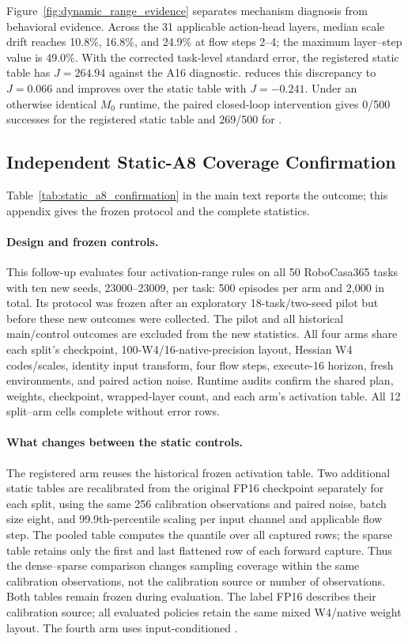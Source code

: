

Figure~\ref{fig:dynamic_range_evidence} separates mechanism diagnosis from behavioral evidence. Across the 31 applicable action-head layers, median scale drift reaches 10.8\%, 16.8\%, and 24.9\% at flow steps 2--4; the maximum layer--step value is 49.0\%. With the corrected task-level standard error, the registered static table has $J=264.94$ against the A16 diagnostic. \dyrange reduces this discrepancy to $J=0.066$ and improves over the static table with $J=-0.241$. Under an otherwise identical $M_0$ runtime, the paired closed-loop intervention gives 0/500 successes for the registered static table and 269/500 for \dyrange.

\subsection{Independent Static-A8 Coverage Confirmation}
\label{sec:static_a8_confirmation}

Table~\ref{tab:static_a8_confirmation} in the main text reports the outcome; this appendix gives the frozen protocol and the complete statistics.

\paragraph{Design and frozen controls.}
This follow-up evaluates four activation-range rules on all 50 RoboCasa365 tasks with ten new seeds, 23000--23009, per task: 500 episodes per arm and 2,000 in total. Its protocol was frozen after an exploratory 18-task/two-seed pilot but before these new outcomes were collected. The pilot and all historical main/control outcomes are excluded from the new statistics. All four arms share each split's checkpoint, 100-W4/16-native-precision layout, Hessian W4 codes/scales, identity input transform, four flow steps, execute-16 horizon, fresh environments, and paired action noise. Runtime audits confirm the shared plan, weights, checkpoint, wrapped-layer count, and each arm's activation table. All 12 split--arm cells complete without error rows.

\paragraph{What changes between the static controls.}
The registered arm reuses the historical frozen activation table. Two additional static tables are recalibrated from the original FP16 checkpoint separately for each split, using the same 256 calibration observations and paired noise, batch size eight, and 99.9th-percentile scaling per input channel and applicable flow step. The pooled table computes the quantile over all captured rows; the sparse table retains only the first and last flattened row of each forward capture. Thus the dense--sparse comparison changes sampling coverage within the same calibration observations, not the calibration source or number of observations. Both tables remain frozen during evaluation. The label FP16 describes their calibration source; all evaluated policies retain the same mixed W4/native weight layout. The fourth arm uses input-conditioned \dyrange.

